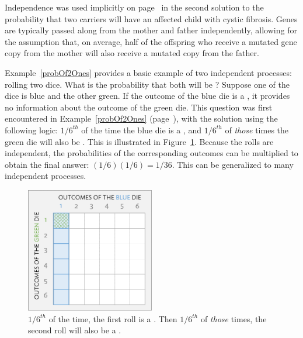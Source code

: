 
Independence was used implicitly on page~\pageref{CFInheritanceExample} in the second solution to the probability that two carriers will have an affected child with cystic fibrosis. Genes are typically passed along from the mother and father independently, allowing for the assumption that, on average, half of the offspring who receive a mutated gene copy from the mother will also receive a mutated copy from the father.

Example~\ref{probOf2Ones} provides a basic example of two independent processes: rolling two dice. What is the probability that both will be ? Suppose one of the dice is blue and the other green. If the outcome of the blue die is a , it provides no information about the outcome of the green die. This question was first encountered in Example~\ref{probOf2Ones} (page~\pageref{probOf2Ones}), with the solution using the following logic: $1/6^{th}$ of the time the blue die is a , and $1/6^{th}$ of \emph{those} times the green die will also be . This is illustrated in Figure~\ref{fig:indepForRollingTwo1s}. Because the rolls are independent, the probabilities of the corresponding outcomes can be multiplied to obtain the final answer: $(1/6)(1/6)=1/36$. This can be generalized to many independent processes. 

\begin{figure}[hht]
\centering
\includegraphics[width=0.5\textwidth]{ch_probability_oi_biostat/figures/indepForRollingTwo1s/indepForRollingTwo1s.png}
\caption{$1/6^{th}$ of the time, the first roll is a . Then $1/6^{th}$ of \emph{those} times, the second roll will also be a .}
\label{fig:indepForRollingTwo1s}
\end{figure}

